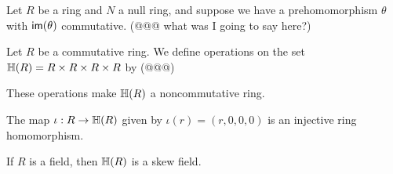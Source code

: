 \begin{exercise}
Let \(R\) be a ring and \(N\) a null ring, and suppose we have a prehomomorphism \(\theta\) with \( \mathsf{im}(\theta) \) commutative. (@@@ what was I going to say here?)
\end{exercise}


\begin{exercise}
Let \(R\) be a commutative ring. We define operations on the set \(\mathbb{H}(R) = R \times R \times R \times R\) by (@@@)
\begin{proplist}
\item These operations make \(\mathbb{H}(R)\) a noncommutative ring.
\item The map \(\iota : R \rightarrow \mathbb{H}(R)\) given by \(\iota(r) = (r,0,0,0)\) is an injective ring homomorphism.
\item If \(R\) is a field, then \(\mathbb{H}(R)\) is a skew field.
\end{proplist}
\end{exercise}
